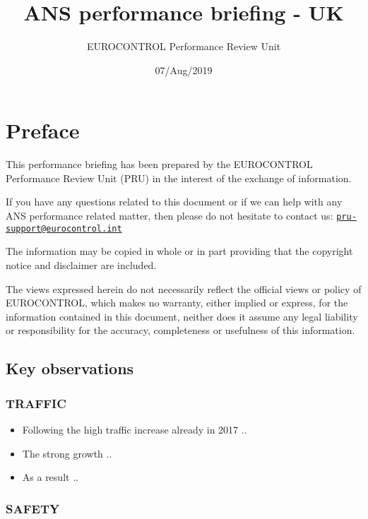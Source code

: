 \documentclass[]{book}
\title{ANS performance briefing - UK}
\author{EUROCONTROL Performance Review Unit}
\date{07/Aug/2019}
\begin{document}
\maketitle

\hypertarget{preface}{%
\chapter*{Preface}\label{preface}}

This performance briefing has been prepared by the EUROCONTROL Performance Review Unit (PRU) in the interest of the exchange of information.

If you have any questions related to this document or if we can help with any ANS performance related matter, then please do not hesitate to contact us: \href{mailto:pru-support@eurocontrol.int}{\nolinkurl{pru-support@eurocontrol.int}}

The information may be copied in whole or in part providing that the copyright notice and disclaimer are included.

The views expressed herein do not necessarily reflect the official views or policy of EUROCONTROL, which makes no warranty, either implied or express, for the information contained in this document, neither does it assume any legal liability or responsibility for the accuracy, completeness or usefulness of this information.

\hypertarget{key-observations}{%
\section*{Key observations}\label{key-observations}}

\hypertarget{traffic}{%
\subsection*{TRAFFIC}\label{traffic}}

\begin{itemize}
\item
  Following the high traffic increase already in 2017 ..
\item
  The strong growth ..
\item
  As a result ..
\end{itemize}

\hypertarget{safety}{%
\subsection*{SAFETY}\label{safety}}
\end{document}
